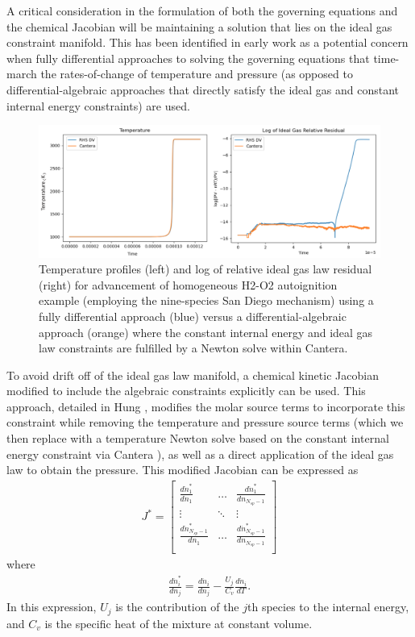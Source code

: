 A critical consideration in the formulation of both the governing equations
and the chemical Jacobian will be maintaining a solution
that lies on the ideal gas constraint manifold. This
has been identified in early work as a potential concern when fully
differential approaches to solving the governing equations that time-march
the rates-of-change of temperature and pressure (as opposed to
differential-algebraic approaches that directly satisfy the ideal gas and
constant internal energy constraints) are used.
\begin{figure}
\centering
\includegraphics[width=0.8\linewidth,trim=4 4 4 4,clip]{figures/autoignition_drift.png}
	\caption{Temperature profiles (left) and log of relative ideal gas law residual (right)
		 for advancement of homogeneous H2-O2 autoignition example (employing the nine-species
		 San Diego mechanism) using a fully differential approach (blue) versus a differential-algebraic
		 approach (orange) where the constant internal energy and ideal gas law constraints are fulfilled
		 by a Newton solve within Cantera.}
\label{fig:autoignition_drift}
\end{figure}
To avoid drift off of the ideal gas law manifold, a chemical
kinetic Jacobian modified to include the algebraic constraints explicitly can
be used. This approach, detailed in Hung \cite{hung2003algorithms}, modifies the molar source terms to incorporate
this constraint while removing the temperature and pressure source terms (which
we then replace with a temperature Newton solve based on the constant internal
energy constraint via Cantera \cite{cantera}), as well as a direct application of the ideal
gas law to obtain the pressure. This modified Jacobian can be expressed as
\begin{align}
J^{*} = \begin{bmatrix}	\frac{d\dot{n}_{1}^{*}}{dn_{1}} & \hdots & \frac{d\dot{n}_{1}^{*}}{dn_{N_{sp}-1}} \\
	                \vdots & \ddots & \vdots \\
	                \frac{d\dot{n}_{N_{sp}-1}^{*}}{dn_{1}} & \hdots & \frac{d\dot{n}_{N_{sp}-1}^{*}}{dn_{N_{sp}-1}} \\
    \end{bmatrix}
\end{align}
where
\begin{align}
\frac{d\dot{n}_{i}^{*}}{dn_{j}} = \frac{d\dot{n}_{i}}{dn_{j}} - \frac{U_{j}}{C_{v}}\frac{d\dot{n}_{i}}{dT}.
\end{align}
In this expression, $U_{j}$ is the contribution of the $j$th species to the
internal energy, and $C_{v}$ is the specific heat of the mixture at constant
volume.

